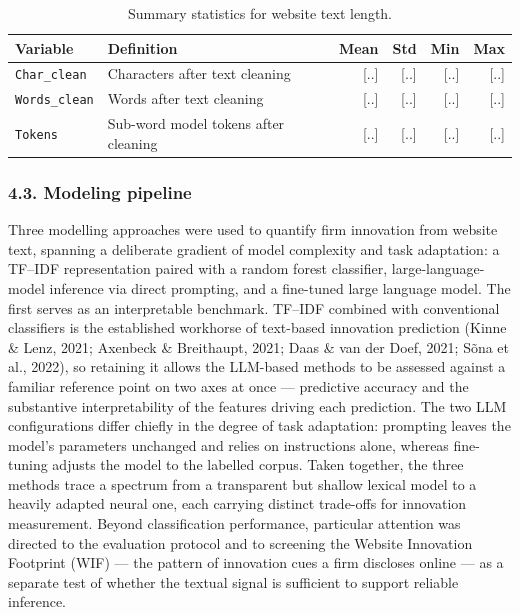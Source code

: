 \documentclass[runningheads]{llncs}
\begin{document}
\bigskip   %

\begin{table}[h]
\centering
\caption{Summary statistics for website text length.}
\label{tab:textlength}
\begin{tabular}{|l|p{5.4cm}|r|r|r|r|}
\hline
\textbf{Variable} & \textbf{Definition} & \textbf{Mean} & \textbf{Std} & \textbf{Min} & \textbf{Max} \\
\hline
\texttt{Char\_clean}  & Characters after text cleaning       & [..] & [..] & [..] & [..] \\
\hline
\texttt{Words\_clean} & Words after text cleaning            & [..] & [..] & [..] & [..] \\
\hline
\texttt{Tokens}       & Sub-word model tokens after cleaning & [..] & [..] & [..] & [..] \\
\hline
\end{tabular}
\end{table}


\subsubsection{4.3. Modeling pipeline}

Three modelling approaches were used to quantify firm innovation from website text, spanning a deliberate gradient of model complexity and task adaptation: a TF–IDF representation paired with a random forest classifier, large-language-model inference via direct prompting, and a fine-tuned large language model. The first serves as an interpretable benchmark. TF–IDF combined with conventional classifiers is the established workhorse of text-based innovation prediction (Kinne \& Lenz, 2021; Axenbeck \& Breithaupt, 2021; Daas \& van der Doef, 2021; Sõna et al., 2022), so retaining it allows the LLM-based methods to be assessed against a familiar reference point on two axes at once — predictive accuracy and the substantive interpretability of the features driving each prediction. The two LLM configurations differ chiefly in the degree of task adaptation: prompting leaves the model's parameters unchanged and relies on instructions alone, whereas fine-tuning adjusts the model to the labelled corpus. Taken together, the three methods trace a spectrum from a transparent but shallow lexical model to a heavily adapted neural one, each carrying distinct trade-offs for innovation measurement. Beyond classification performance, particular attention was directed to the evaluation protocol and to screening the Website Innovation Footprint (WIF) — the pattern of innovation cues a firm discloses online — as a separate test of whether the textual signal is sufficient to support reliable inference.
\end{document}
